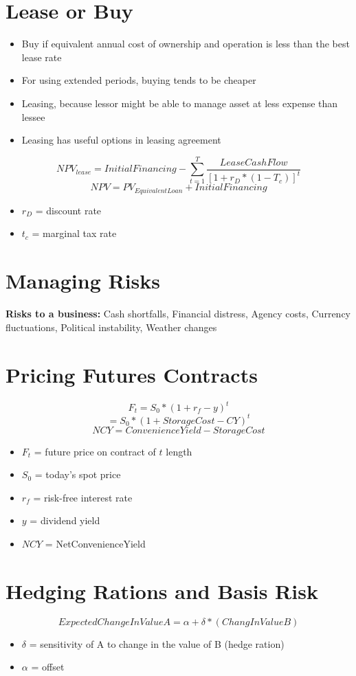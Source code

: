 \documentclass{cheatsheet}
\begin{document}
\section*{Lease or Buy}
\begin{itemize}
  \item Buy if equivalent annual cost of ownership and operation is less than the best lease rate
  \item For using extended periods, buying tends to be cheaper
  \item Leasing, because lessor might be able to manage asset at less expense than lessee
  \item Leasing has useful options in leasing agreement
\end{itemize}
\[NPV_{lease} = InitialFinancing - \sum_{t=1}^{T}\frac{LeaseCashFlow}{[1 + r_D * (1-T_c)]^t}\]
\[NPV = PV_{EquivalentLoan} + InitialFinancing\]
\begin{itemize}
  \item $r_D$ = discount rate
  \item $t_c$ = marginal tax rate
\end{itemize}
\section*{Managing Risks}
\textbf{Risks to a business:} Cash shortfalls, Financial distress, Agency costs, Currency fluctuations, Political instability, Weather changes
\section*{Pricing Futures Contracts}
\[F_t = S_0 * (1 + r_f - y)^t \]
\[= S_0 * (1 + StorageCost - CY)^t\]
\[NCY = ConvenienceYield - StorageCost\]
\begin{itemize}
  \item $F_t$ = future price on contract of $t$ length
  \item $S_0$ = today's spot price
  \item $r_f$ = risk-free interest rate
  \item $y$ = dividend yield 
  \item $NCY$ = NetConvenienceYield
\end{itemize}
\section*{Hedging Rations and Basis Risk}
\[ExpectedChangeInValueA = \alpha + \delta * (ChangInValueB)\]
\begin{itemize}
  \item $\delta$ = sensitivity of A to change in the value of B (hedge ration)
  \item $\alpha$ = offset
\end{itemize}
\end{document}
